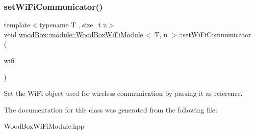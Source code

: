 \subsubsection{\texorpdfstring{set\+Wi\+Fi\+Communicator()}{setWiFiCommunicator()}}
{\footnotesize\ttfamily template$<$typename T , size\+\_\+t n$>$ \\
void \mbox{\hyperlink{classwood_box_1_1module_1_1_wood_box_wi_fi_module}{wood\+Box\+::module\+::\+Wood\+Box\+Wi\+Fi\+Module}}$<$ T, n $>$\+::set\+Wi\+Fi\+Communicator (\begin{DoxyParamCaption}\item[{\mbox{\hyperlink{classwood_box_1_1communication_1_1wifi_1_1_a_wi_fi_communicator}{communication\+::wifi\+::\+A\+Wi\+Fi\+Communicator}} \&}]{wifi }\end{DoxyParamCaption})\hspace{0.3cm}{\ttfamily [inline]}}

Set the Wi\+Fi object used for wireless communication by passing it as reference. 

The documentation for this class was generated from the following file\+:\begin{DoxyCompactItemize}
\item 
Wood\+Box\+Wi\+Fi\+Module.\+hpp\end{DoxyCompactItemize}
